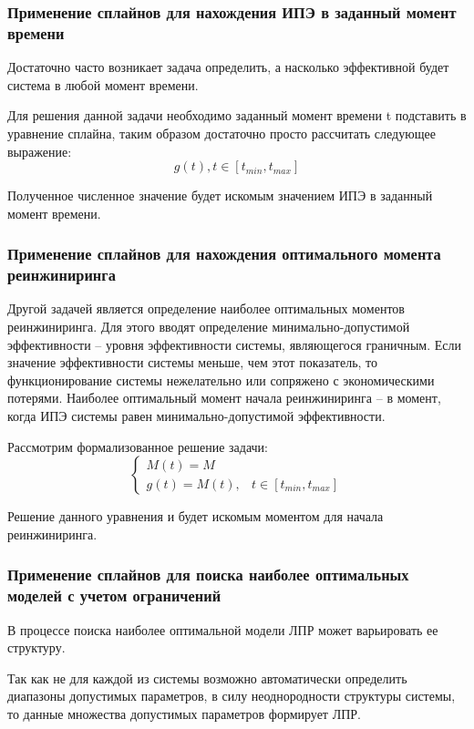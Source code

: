 \subsubsection{Применение сплайнов для нахождения ИПЭ в заданный момент времени}
Достаточно часто возникает задача определить, а насколько эффективной будет система в любой момент времени. 

Для решения данной задачи необходимо заданный момент времени t подставить в уравнение сплайна, таким образом достаточно просто рассчитать следующее выражение:
\begin{equation}
    g(t), t \in [t_{min},t_{max}]
\end{equation}

Полученное численное значение будет искомым значением ИПЭ в заданный момент времени.

\subsubsection{Применение сплайнов для нахождения оптимального момента реинжиниринга}

Другой задачей является определение наиболее оптимальных моментов реинжиниринга.
Для этого вводят определение минимально-допустимой эффективности – уровня эффективности системы, являющегося граничным. 
Если значение эффективности системы меньше, чем этот показатель, то функционирование системы нежелательно или сопряжено с экономическими потерями. 
Наиболее оптимальный момент начала реинжиниринга – в момент, когда ИПЭ системы равен минимально-допустимой эффективности.

Рассмотрим формализованное решение задачи:\begin{equation}
    \begin{cases}
        M(t)=M  \\
        g(t)=M(t), & t \in [t_{min},t_{max}]
    \end{cases}
\end{equation}

Решение данного уравнения и будет искомым моментом для начала реинжиниринга.

\subsubsection{Применение сплайнов для поиска наиболее оптимальных моделей с учетом ограничений}
В процессе поиска наиболее оптимальной модели ЛПР может варьировать ее структуру.

Так как не для каждой из системы возможно автоматически определить диапазоны допустимых параметров, 
в силу неоднородности структуры системы, то данные множества допустимых параметров формирует ЛПР.

